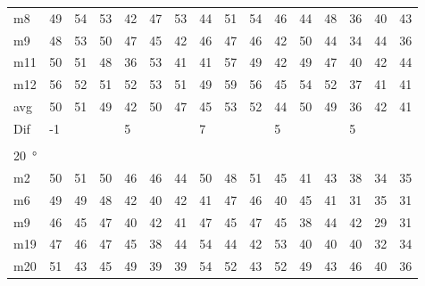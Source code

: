 \begin{table}[H]
\begin{tabular}{l|l|l|l|l|l|l|l|l|l|l|l|l|lll}
m8    & 49     &  54    & 53     & 42     &  47    & 53     & 44     & 51      &    54  &    46   &   44   &   48   & \multicolumn{1}{l|}{36} & \multicolumn{1}{l|}{40} & 43 \\ 
m9    &  48    & 53     &  50    & 47     &   45   &  42    & 46     &  47     &   46   &     42  &    50  &   44   & \multicolumn{1}{l|}{34} & \multicolumn{1}{l|}{44} & 36 \\ 
m11  &  50    & 51     &  48    &  36    &   53   &  41    & 41     &   57    &    49  &     42  &    49  &    47  & \multicolumn{1}{l|}{40} & \multicolumn{1}{l|}{42} & 44 \\ 
m12  &  56    & 52     &  51    &  52    &  53    & 51     & 49     &   59    &    56  &    45   &    54  &  52    & \multicolumn{1}{l|}{37} & \multicolumn{1}{l|}{41} & 41 \\ \hline
avg &  50    & 51     &  49    &   42   &  50    & 47     &  45    &  53     & 52     &   44    &  50    &  49    & \multicolumn{1}{l|}{36} & \multicolumn{1}{l|}{42}  & 41  \\ \hline  
Dif & \multicolumn{3}{l|}{-1} & \multicolumn{3}{l|}{5} & \multicolumn{3}{l|}{7} & \multicolumn{3}{l|}{5} & \multicolumn{3}{l}{5}  \\ 
 \multicolumn{16}{l}{ } \\                             
\SI{20}{\degree}   & \multicolumn{3}{l|}{} & \multicolumn{3}{l|}{} & \multicolumn{3}{l|}{} & \multicolumn{3}{l|}{} & \multicolumn{3}{l}{}   \\  \hline
m2    & 50     &  51    &  50    &  46    &  46    &  44    &  50    &   48    &  51    &  45     &  41    &  43    & \multicolumn{1}{l|}{38} & \multicolumn{1}{l|}{34} & 35  \\
m6    & 49     &  49    &  48    & 42     &  40    &  42    &   41   &   47    &   46   &   40    &  45    &  41    & \multicolumn{1}{l|}{31} & \multicolumn{1}{l|}{35} & 31  \\
m9    &  46    &  45    & 47     &  40    &   42   &   41   &   47   &   45    &  47    &   45    &  38   &  44    & \multicolumn{1}{l|}{42} & \multicolumn{1}{l|}{29} & 31 \\
m19  &    47  &  46    &  47    &  45    &  38    &    44  &   54   &   44    &   42   &   53    &  40   &   40   & \multicolumn{1}{l|}{40} & \multicolumn{1}{l|}{32} & 34 \\
m20  & 51     &  43    &  45    &  49    &  39    &    39  &   54   &   52    &   43   &  52     &  49    &   43   & \multicolumn{1}{l|}{46} & \multicolumn{1}{l|}{40} &  36\\ \hline

\end{tabular}
\end{table}
